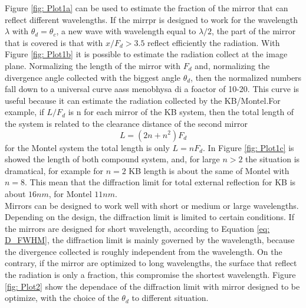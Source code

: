 %
\noindent Figure \ref{fig: Plot1a} can be used to estimate the fraction of the mirror that can reflect different wavelengths. If the mirrpr is designed to work for the wavelength $\lambda $ with $\theta_d = \theta_c $, a new wave with wavelength equal to $\lambda / 2 $, the part of the mirror that is covered is that with $x / F_d > 3.5$ reflect efficiently the radiation. With Figure \ref{fig: Plot1b}  it is possible to estimate the radiation collect at the image plane. Normalizing the length of the mirror with $F_d $ and, normalizing the divergence angle collected with the biggest angle $\theta_d $, then the normalized numbers fall down to a universal curve aass menobhysa di a foactor of 10-20. This curve is useful because it can estimate the radiation collected by the KB/Montel.For example, if $L/F_d $ is n for each mirror of the KB system, then the total length of the system is related to the clearance distance of the second mirror
\begin{equation}
L= (2 n + n^2 ) F_d
\label{eq: clearance distance}
\end{equation}
\noindent for the Montel system the total length is only $L = n F_d $. In Figure \ref{fig: Plot1c} is showed the length of both compound system, and, for large  $n>2 $ the situation is dramatical, for example for $n=2 $ KB length is about the same of Montel with $n=8 $. This mean that the diffraction limit for total external reflection for KB is about $16 nm$, for Montel $11 nm$.
\\
Mirrors can be designed to work well with short or medium or large wavelengths. Depending on the design, the diffraction  limit is limited to certain conditions. If the mirrors are designed for short wavelength, according to Equation \ref{eq: D_FWHM}, the diffraction limit is mainly governed by the wavelength, because the divergence collected is roughly independent from the wavelength. On the contrary, if the mirror are optimized to long wavelengths, the surface that reflect the radiation is only a fraction, this compromise the shortest wavelength. Figure \ref{fig: Plot2} show the dependace of the diffraction limit with mirror designed to be optimize, with the choice of the $\theta_d $ to different situation.
%
%
